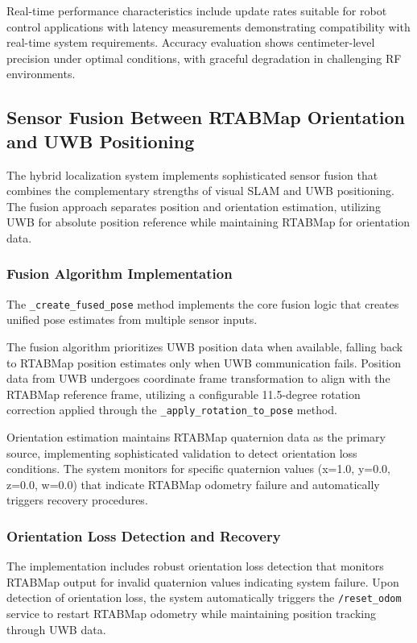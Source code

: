 Real-time performance characteristics include update rates suitable for robot control applications with latency measurements demonstrating compatibility with real-time system requirements. Accuracy evaluation shows centimeter-level precision under optimal conditions, with graceful degradation in challenging RF environments.

\subsection{Sensor Fusion Between RTABMap Orientation and UWB Positioning}

The hybrid localization system implements sophisticated sensor fusion that combines the complementary strengths of visual SLAM and UWB positioning. The fusion approach separates position and orientation estimation, utilizing UWB for absolute position reference while maintaining RTABMap for orientation data.

\subsubsection{Fusion Algorithm Implementation}

 The \texttt{\_create\_fused\_pose} method implements the core fusion logic that creates unified pose estimates from multiple sensor inputs.

The fusion algorithm prioritizes UWB position data when available, falling back to RTABMap position estimates only when UWB communication fails. Position data from UWB undergoes coordinate frame transformation to align with the RTABMap reference frame, utilizing a configurable 11.5-degree rotation correction applied through the \texttt{\_apply\_rotation\_to\_pose} method.

Orientation estimation maintains RTABMap quaternion data as the primary source, implementing sophisticated validation to detect orientation loss conditions. The system monitors for specific quaternion values (x=1.0, y=0.0, z=0.0, w=0.0) that indicate RTABMap odometry failure and automatically triggers recovery procedures.

\subsubsection{Orientation Loss Detection and Recovery}

The implementation includes robust orientation loss detection that monitors RTABMap output for invalid quaternion values indicating system failure. Upon detection of orientation loss, the system automatically triggers the \texttt{/reset\_odom} service to restart RTABMap odometry while maintaining position tracking through UWB data.

